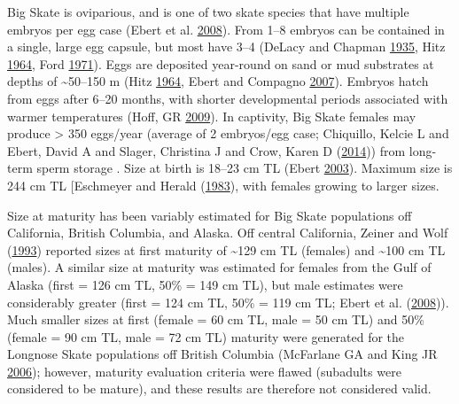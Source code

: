 \documentclass[12pt,]{article}
\begin{document}
Big Skate is oviparious, and is one of two skate species that have
multiple embryos per egg case (Ebert et al.
\protect\hyperlink{ref-Ebert2008}{2008}). From 1--8 embryos can be
contained in a single, large egg capsule, but most have 3--4 (DeLacy and
Chapman \protect\hyperlink{ref-DeLacy1935}{1935}, Hitz
\protect\hyperlink{ref-Hitz1964}{1964}, Ford
\protect\hyperlink{ref-Ford1971}{1971}). Eggs are deposited year-round
on sand or mud substrates at depths of \textasciitilde{}50--150 m (Hitz
\protect\hyperlink{ref-Hitz1964}{1964}, Ebert and Compagno
\protect\hyperlink{ref-Ebert2007}{2007}). Embryos hatch from eggs after
6--20 months, with shorter developmental periods associated with warmer
temperatures (Hoff, GR \protect\hyperlink{ref-Hoff2009}{2009}). In
captivity, Big Skate females may produce \textgreater{} 350 eggs/year
(average of 2 embryos/egg case; Chiquillo, Kelcie L and Ebert, David A
and Slager, Christina J and Crow, Karen D
(\protect\hyperlink{ref-Chiquillo2014}{2014})) from long-term sperm
storage . Size at birth is 18--23 cm TL (Ebert
\protect\hyperlink{ref-Ebert2003}{2003}). Maximum size is 244 cm TL
{[}Eschmeyer and Herald (\protect\hyperlink{ref-Eschmeyer1983}{1983}),
with females growing to larger sizes.

Size at maturity has been variably estimated for Big Skate populations
off California, British Columbia, and Alaska. Off central California,
Zeiner and Wolf (\protect\hyperlink{ref-ZeinerWolf1993}{1993}) reported
sizes at first maturity of \textasciitilde{}129 cm TL (females) and
\textasciitilde{}100 cm TL (males). A similar size at maturity was
estimated for females from the Gulf of Alaska (first = 126 cm TL, 50\% =
149 cm TL), but male estimates were considerably greater (first = 124 cm
TL, 50\% = 119 cm TL; Ebert et al.
(\protect\hyperlink{ref-Ebert2008}{2008})). Much smaller sizes at first
(female = 60 cm TL, male = 50 cm TL) and 50\% (female = 90 cm TL, male =
72 cm TL) maturity were generated for the Longnose Skate populations off
British Columbia (McFarlane GA and King JR
\protect\hyperlink{ref-McFandKing2006}{2006}); however, maturity
evaluation criteria were flawed (subadults were considered to be
mature), and these results are therefore not considered valid.
\end{document}
